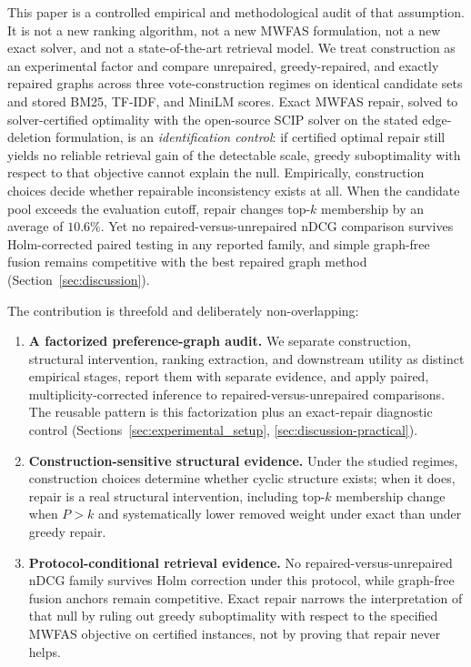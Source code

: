 \documentclass[pdflatex,sn-basic,Numbered]{sn-jnl}
\begin{document}
This paper is a controlled empirical and methodological audit of that
assumption. It is not a new ranking algorithm, not a new MWFAS formulation,
not a new exact solver, and not a state-of-the-art retrieval model. We treat
construction as an experimental factor and compare unrepaired,
greedy-repaired, and exactly repaired graphs across three vote-construction
regimes on identical candidate sets and stored BM25, TF-IDF, and MiniLM
scores. Exact MWFAS repair, solved to solver-certified optimality with the
open-source SCIP solver on the stated edge-deletion formulation, is an
\emph{identification control}: if certified optimal repair still yields no
reliable retrieval gain of the detectable scale, greedy suboptimality with
respect to that objective cannot explain the null. Empirically,
construction choices decide whether repairable inconsistency exists at all.
When the candidate pool exceeds the evaluation cutoff, repair changes
top-$k$ membership by an average of $10.6\%$. Yet no
repaired-versus-unrepaired nDCG comparison survives Holm-corrected paired
testing in any reported family, and simple graph-free fusion remains
competitive with the best repaired graph method
(Section~\ref{sec:discussion}).

The contribution is threefold and deliberately non-overlapping:

\begin{enumerate}
  \item \textbf{A factorized preference-graph audit.} We separate
    construction, structural intervention, ranking extraction, and
    downstream utility as distinct empirical stages, report them with
    separate evidence, and apply paired, multiplicity-corrected inference
    to repaired-versus-unrepaired comparisons. The reusable pattern is this
    factorization plus an exact-repair diagnostic control
    (Sections~\ref{sec:experimental_setup}, \ref{sec:discussion-practical}).
  \item \textbf{Construction-sensitive structural evidence.} Under the
    studied regimes, construction choices determine whether cyclic
    structure exists; when it does, repair is a real structural
    intervention, including top-$k$ membership change when $P>k$ and
    systematically lower removed weight under exact than under greedy
    repair.
  \item \textbf{Protocol-conditional retrieval evidence.} No
    repaired-versus-unrepaired nDCG family survives Holm correction under
    this protocol, while graph-free fusion anchors remain competitive.
    Exact repair narrows the interpretation of that null by ruling out
    greedy suboptimality with respect to the specified MWFAS objective on
    certified instances, not by proving that repair never helps.
\end{enumerate}
\end{document}
